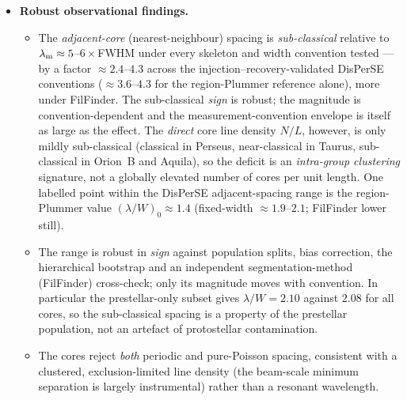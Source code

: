 \documentclass[usenatbib,twoside,twocolumn]{mnras}
\begin{document}
\begin{itemize}
    \item \textbf{Robust observational findings.}
    \begin{itemize}
        \item The \emph{adjacent-core} (nearest-neighbour) spacing is \emph{sub-classical} relative to $\lambda_{\rm m}\approx5$--$6\times$FWHM under every skeleton and width convention tested --- by a factor $\approx2.4$--$4.3$ across the injection--recovery-validated DisPerSE conventions ($\approx3.6$--$4.3$ for the region-Plummer reference alone), more under FilFinder. The sub-classical \emph{sign} is robust; the magnitude is convention-dependent and the measurement-convention envelope is itself as large as the effect. The \emph{direct} core line density $N/L$, however, is only mildly sub-classical (classical in Perseus, near-classical in Taurus, sub-classical in Orion~B and Aquila), so the deficit is an \emph{intra-group clustering} signature, not a globally elevated number of cores per unit length. One labelled point within the DisPerSE adjacent-spacing range is the region-Plummer value $(\lambda/W)_0\approx1.4$ (fixed-width $\approx1.9$--$2.1$; FilFinder lower still).
        \item The range is robust in \emph{sign} against population splits, bias correction, the hierarchical bootstrap and an independent segmentation-method (FilFinder) cross-check; only its magnitude moves with convention. In particular the prestellar-only subset gives $\lambda/W=2.10$ against $2.08$ for all cores, so the sub-classical spacing is a property of the prestellar population, not an artefact of protostellar contamination.
        \item The cores reject \emph{both} periodic and pure-Poisson spacing, consistent with a clustered, exclusion-limited line density (the beam-scale minimum separation is largely instrumental) rather than a resonant wavelength.
    \end{itemize}


\end{itemize}
\end{document}
